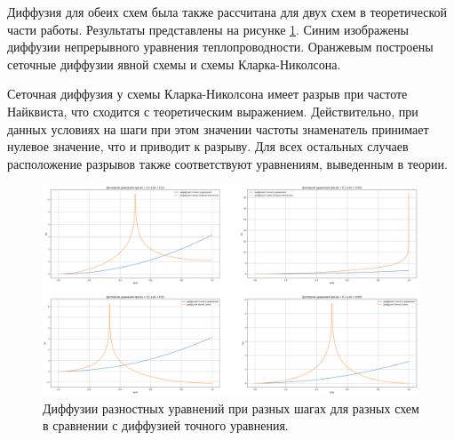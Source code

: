 \documentclass[diploma]{nanolab2015}
\begin{document}
Диффузия для обеих схем была также рассчитана для двух схем в теоретической части работы. Результаты представлены на рисунке \ref{pic5}. Синим изображены диффузии
непрерывного уравнения теплопроводности. Оранжевым построены сеточные
диффузии явной схемы и схемы Кларка-Николсона. 

Сеточная диффузия у схемы Кларка-Николсона имеет разрыв при частоте Найквиста, что сходится с теоретическим выражением. Действительно, при данных условиях на шаги при этом значении частоты знаменатель принимает нулевое значение, что и приводит к
разрыву. Для всех остальных случаев расположение разрывов также соответствуют уравнениям, выведенным в теории. 

\begin{figure}[h!]
\centering
\includegraphics[scale=0.26]{D.jpg}
\caption{\label{pic5}  Диффузии разностных уравнений при разных шагах для разных схем в сравнении с диффузией точного уравнения.}
\end{figure}
\end{document}
